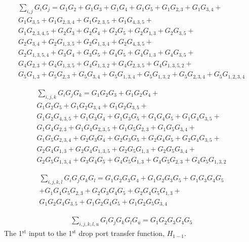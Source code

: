\documentclass{osa-article}
\begin{document}
\begin{equation}
\begin{split}
\sum_{i,j} {G_i G_j}=G_1G_2+G_1G_3+G_1G_4+G_1G_5+G_1G_{2,3}+G_1G_{3,4}
+\\G_1G_{3,5}+G_1G_{2,3,4}+G_1G_{2,3,5}+G_1G_{4,3,5}+\\G_1G_{2,3,4,5}+G_2G_3+G_2G_4+G_2G_5+G_2G_{1,3}+G_2G_{3,5}+\\G_2G_{3,4}+G_2G_{1,3,5}+G_2G_{1,3,4}+G_2G_{4,3,5}+\\G_2G_{1,3,5,4}+G_3G_4+G_3G_5+G_4G_5+G_4G_{1,3}+G_4G_{3,5}+\\G_4G_{2,3}+G_4G_{1,3,5}+G_4G_{1,3,2}+G_4G_{2,3,5}+G_4G_{1,3,5,2}+\\G_5G_{1,3}+G_5G_{2,3}+G_5G_{3,4}+G_5G_{1,3,4}+G_5G_{1,3,2}+G_5G_{2,3,4}+G_5G_{1,2,3,4} 
\label{eqa44}
\end{split}
\end{equation}

\begin{equation}
\begin{split}
\sum_{i,j,k} {G_i G_j G_k}=G_1G_2G_3+G_1G_2G_4+\\G_1G_2G_5+G_1G_2G_{3,4}+G_1G_2G_{3,5}+\\G_1G_2G_{4,3,5}+G_1G_3G_4+G_1G_3G_5+G_1G_4G_5+G_1G_4G_{3,5}+\\G_1G_4G_{2,3}+G_1G_4G_{2,3,5}+G_1G_5G_{2,3}+G_1G_5G_{3,4}+\\G_1G_5G_{2,3,4}+G_2G_3G_4+G_2G_3G_5+G_2G_4G_5+G_2G_4G_{3,5}+\\G_2G_4G_{1,3}+G_2G_4G_{1,3,5}+G_2G_5G_{1,3}+G_2G_5G_{3,4}+\\G_2G_5G_{1,3,4}+G_3G_4G_5+G_4G_5G_{1,3}+G_4G_5G_{2,3}+G_4G_5G_{1,3,2} 
\label{eqa45}
\end{split}
\end{equation}

\begin{equation}
\begin{split}
\sum_{i,j,k,l} {G_i G_j G_kG_l}=G_1G_2G_3G_4+G_1G_2G_3G_5+G_1G_3G_4G_5\\
+G_1G_4G_5G_{2,3}+G_2G_3G_4G_5+G_2G_4G_5G_{1,3}+\\
G_1G_2G_4G_{3,5}+G_1G_2G_4G_5+G_1G_2G_5G_{3,4}
\label{eqa46}
\end{split}
\end{equation}

\begin{equation}
\begin{split}
\sum_{i,j,k,l,u} {G_i G_j G_kG_lG_u}=G_1G_2G_3G_4G_5 
\label{eqa47}
\end{split}
\end{equation}
The 1$^{\text{st}}$ input to the 1$^{\text{st}}$ drop port transfer function, $H_{1-1}$.\\
\end{document}
